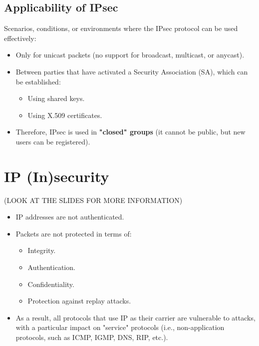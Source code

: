 \subsection{Applicability of IPsec}
Scenarios, conditions, or environments where the IPsec protocol can be used effectively:
\begin{itemize}
    \item Only for unicast packets (no support for broadcast, multicast, or anycast).
    \item Between parties that have activated a Security Association (SA), which can be established:
    \begin{itemize}
        \item Using shared keys.
        \item Using X.509 certificates.
    \end{itemize}
    \item Therefore, IPsec is used in \textbf{"closed" groups} (it cannot be public, but new users can be registered).
\end{itemize}

\clearpage

\section{IP (In)security}
(LOOK AT THE SLIDES FOR MORE INFORMATION)
\begin{itemize}
    \item IP addresses are not authenticated.
    \item Packets are not protected in terms of:
    \begin{itemize}
        \item Integrity.
        \item Authentication.
        \item Confidentiality.
        \item Protection against replay attacks.
    \end{itemize}
    \item As a result, all protocols that use IP as their carrier are vulnerable to attacks, with a particular impact on "service" protocols (i.e., non-application protocols, such as ICMP, IGMP, DNS, RIP, etc.).
\end{itemize}

